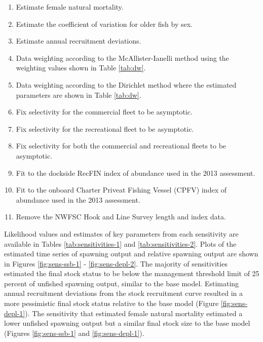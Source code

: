 \documentclass[11pt,
  english,
  a4paper,
]{article}
\begin{document}
\begin{enumerate}
   
  \item Estimate female natural mortality.

  \item Estimate the coefficient of variation for older fish by sex. 

  \item Estimate annual recruitment deviations.

  \item Data weighting according to the McAllister-Ianelli method using the weighting values shown in Table \ref{tab:dw}. 
  
  \item Data weighting according to the Dirichlet method where the estimated parameters are shown in Table \ref{tab:dw}.

  \item Fix selectivity for the commercial fleet to be asymptotic. 
  
  \item Fix selectivity for the recreational fleet to be asymptotic. 
    
  \item Fix selectivity for both the commercial and recreational fleets to be asymptotic. 
  
  \item Fit to the dockside RecFIN index of abundance used in the 2013 assessment. 

  \item Fit to the onboard Charter Priveat Fishing Vessel (CPFV) index of abundance used in the 2013 assessment. 

  \item Remove the NWFSC Hook and Line Survey length and index data.
  
\end{enumerate}


Likelihood values and estimates of key parameters from each sensitivity are available in Tables \ref{tab:sensitivities-1} and \ref{tab:sensitivities-2}. Plots of the estimated time series of spawning output and relative spawning output are shown in Figures \ref{fig:sens-ssb-1} - \ref{fig:sens-depl-2}. The majority of sensitivities estimated the final stock status to be below the management threshold limit of 25 percent of unfished spawning output, similar to the base model. Estimating annual recruitment deviations from the stock recruitment curve resulted in a more pessimistic final stock status relative to the base model (Figure \ref{fig:sens-depl-1}). The sensitivity that estimated female natural mortality estimated a lower unfished spawning output but a similar final stock size to the base model (Figures \ref{fig:sens-ssb-1} and \ref{fig:sens-depl-1}).
\end{document}
